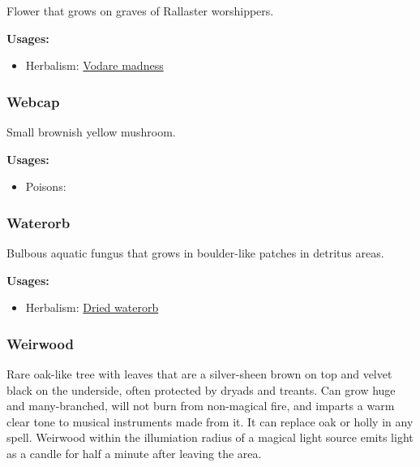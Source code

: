 Flower that grows on graves of Rallaster worshippers.

\vspace{5mm}

\textbf{Usages:}

\begin{itemize}[noitemsep]
\item[] Herbalism: \hyperref[Vodare madness]{Vodare madness}
\end{itemize}

\subsubsection{Webcap}
\label{Webcap}

Small brownish yellow mushroom.

\vspace{5mm}

\textbf{Usages:}

\begin{itemize}[noitemsep]
\item[] Poisons: \poison
\end{itemize}

\subsubsection{Waterorb}
\label{Waterorb}

Bulbous aquatic fungus that grows in boulder-like patches in detritus areas.

\vspace{5mm}

\textbf{Usages:}

\begin{itemize}[noitemsep]
\item[] Herbalism: \hyperref[Dried waterorb]{Dried waterorb}
\end{itemize}

\subsubsection{Weirwood}

Rare oak-like tree with leaves that are a silver-sheen brown on top and velvet black on the underside, often protected by dryads and treants. Can grow huge and many-branched, will not burn from non-magical fire, and imparts a warm clear tone to musical instruments made from it. It can replace oak or holly in any spell. Weirwood within the illumiation radius of a magical light source emits light as a candle for half a minute after leaving the area.

